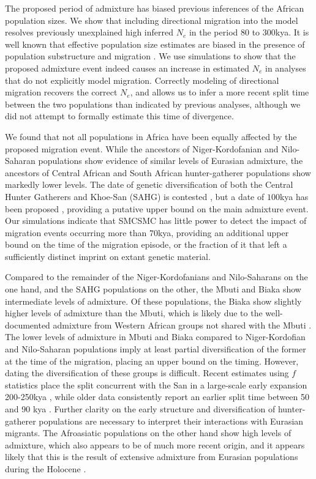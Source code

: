 The proposed period of admixture has biased previous inferences of the African population sizes. We show that including directional migration into the model resolves previously unexplained high inferred $N_e$ in the period $80$ to $300$kya. It is well known that effective population size estimates are biased in the presence of population substructure and migration \cite{Chikhi2018, Li2011}. We use simulations to show that the proposed admixture event indeed causes an increase in estimated $N_e$ in analyses that do not explicitly model migration.  Correctly modeling of directional migration recovers the correct $N_e$, and allows us to infer a more recent split time between the two populations than indicated by previous analyses, although we did not attempt to formally estimate this time of divergence.

We found that not all populations in Africa have been equally affected by the proposed migration event. While the ancestors of Niger-Kordofanian and Nilo-Saharan populations show evidence of similar levels of Eurasian admixture, the ancestors of Central African and South African hunter-gatherer populations show markedly lower levels.  The date of genetic diversification of both the Central Hunter Gatherers and Khoe-San (SAHG) is contested \cite{Lipson2019}, but a date of $100$kya has been proposed \cite{Schlebusch2012}, providing a putative upper bound on the main admixture event.  Our simulations indicate that SMCSMC has little power to detect the impact of migration events occurring more than $70$kya, providing an additional upper bound on the time of the migration episode, or the fraction of it that left a sufficiently distinct imprint on extant genetic material.

Compared to the remainder of the Niger-Kordofanians and Nilo-Saharans on the one hand, and the SAHG populations on the other, the Mbuti and Biaka show intermediate levels of admixture. Of these populations, the Biaka show slightly higher levels of admixture than the Mbuti, which is likely due to the well-documented admixture from Western African groups not shared with the Mbuti \cite{Batini2011}. The lower levels of admixture in Mbuti and Biaka compared to Niger-Kordofian and Nilo-Saharan populations imply at least partial diversification of the former at the time of the migration, placing an upper bound on the timing. However, dating the diversification of these groups is difficult. Recent estimates using $f$ statistics place the split concurrent with the San in a large-scale early expansion 200-250kya \cite{Lipson2019}, while older data consistently report an earlier split time between 50 and 90 kya \cite{Patin2018}. Further clarity on the early structure and diversification of hunter-gatherer populations are necessary to interpret their interactions with Eurasian migrants. The  Afroasiatic populations on the other hand show high levels of admixture, which also appears to be of much more recent origin, and it appears likely that this is the result of extensive admixture from Eurasian populations during the Holocene \cite{Busby2016, Fan2019}. 

